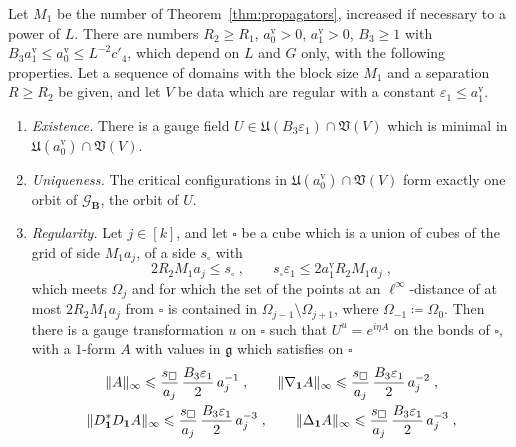 \documentclass[11pt]{preprint}
\newcommand{\id}{\mathbf 1}
\DeclarePairedDelimiter{\norm}{\lVert}{\rVert}
\numberwithin{equation}{section}
\begin{document}
\begin{theorem}\label{thm:minimiser}
Let $M_1$ be the number of Theorem~\ref{thm:propagators}, increased if necessary to a power of $L$. There are numbers $R_2 \geqslant R_1$, $a^{\mathrm v}_0 > 0$, $a^{\mathrm v}_1 > 0$, $B_3 \geqslant 1$ with $B_3a^{\mathrm v}_1 \leqslant a^{\mathrm v}_0 \leqslant L^{-2}c'_4$, which depend on $L$ and $G$ only, with the following properties. Let a sequence of domains with the block size $M_1$ and a separation $R \geqslant R_2$ be given, and let $V$ be data which are regular with a constant $\varepsilon_1 \leqslant a^{\mathrm v}_1$.
\begin{enumerate}[label=(\roman*)]
\item \emph{Existence.} There is a gauge field $U \in \mathfrak U(B_3\varepsilon_1) \cap \mathfrak V(V)$ which is minimal in $\mathfrak U(a^{\mathrm v}_0) \cap \mathfrak V(V)$.
\item \emph{Uniqueness.} The critical configurations in $\mathfrak U(a^{\mathrm v}_0) \cap \mathfrak V(V)$ form exactly one orbit of $\mathcal G_{\mathbf B}$, the orbit of $U$.
\item \emph{Regularity.} Let $j \in [k]$, and let $\square$ be a cube which is a union of cubes of the grid of side $M_1a_j$, of a side $s_\square$ with
\begin{equation}\label{eq:minimiser-cube}
    2R_2M_1a_j \leqslant s_\square\;,
    \qquad
    s_\square\varepsilon_1 \leqslant 2a^{\mathrm v}_1R_2M_1a_j\;,
\end{equation}
which meets $\Omega_j$ and for which the set of the points at an $\ell^\infty$-distance of at most $2R_2M_1a_j$ from $\square$ is contained in $\Omega_{j-1} \setminus \Omega_{j+1}$, where $\Omega_{-1} \coloneqq \Omega_0$. Then there is a gauge transformation $u$ on $\square$ such that $U^u = e^{i\eta A}$ on the bonds of $\square$, with a $1$-form $A$ with values in $\mathfrak g$ which satisfies on $\square$
\begin{equation}\label{eq:minimiser-regularity}
\begin{gathered}
    \norm A_\infty\leqslant \frac{s_\square}{a_j}\,\frac{B_3\varepsilon_1}{2}\,a_j^{-1}\;,
    \qquad
    \norm{\nabla_{\id}A}_\infty \leqslant \frac{s_\square}{a_j}\,\frac{B_3\varepsilon_1}{2}\,a_j^{-2}\;,\\
    \norm{D^*_{\id}D_{\id}A}_\infty \leqslant \frac{s_\square}{a_j}\,\frac{B_3\varepsilon_1}{2}\,a_j^{-3}\;,
    \qquad
    \norm{\Delta_{\id}A}_\infty \leqslant \frac{s_\square}{a_j}\,\frac{B_3\varepsilon_1}{2}\,a_j^{-3}\;,

\end{gathered}
\end{equation}
\end{enumerate}
\end{theorem}
\end{document}
